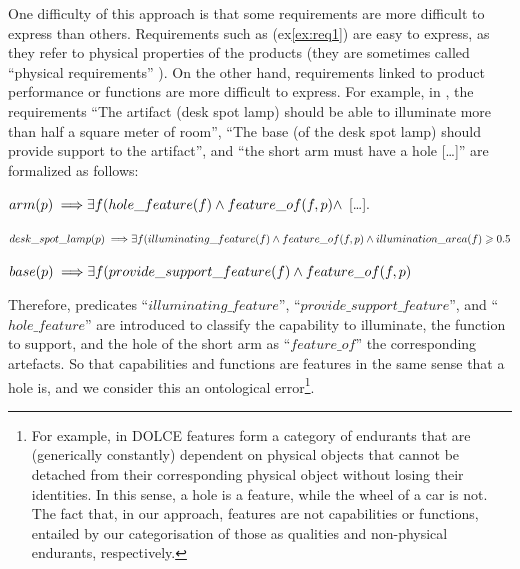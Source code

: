 \documentclass[sw]{iosart2x}
\newcommand{\bflist}{\begin{list}{}{\setlength{\topsep}{2mm}\setlength{\partopsep}{0mm}\setlength{\parsep}{0mm}\setlength{\leftmargin}{9mm}\setlength{\labelwidth}{8mm}}}
\newcommand{\eflist}{\end{list}}
\newcommand{\ExLabel}{\textrm{ex}}
\newcommand{\myex}[1]{\refstepcounter{cntex}\begin{small}{\bf \ExLabel\thecntex\label{ex:#1}}\end{small}}
\newcounter{cntex}
\newcommand{\refex}[1]{({\ExLabel}\ref{#1})}
\newcommand{\myfi}{\hspace{0.9mm} \Longrightarrow}
\newcommand{\DOLCE}{\textsc{DOLCE}\xspace} %
\newcommand{\qquotes}[1]{``#1''}
\begin{document}
One difficulty of this approach is that some requirements are more difficult to express than others.
Requirements such as \refex{ex:req1} are easy to express, as they refer to physical properties of the products (they are sometimes called \qquotes{physical requirements} \cite{jinxinlinRequirementOntologyEngineering1996}).
On the other hand, requirements linked to product performance or functions are more difficult to express.
For example, in \cite{jinxinlinRequirementOntologyEngineering1996}, the requirements \qquotes{The artifact (desk spot lamp) should be able to illuminate more than half a square meter of room}, \qquotes{The base (of the desk spot lamp) should provide support to the artifact}, and \qquotes{the short arm must have a hole [\dots]} are formalized as follows: 
\bflist
  \item[\myex{req2}] $ arm(p) \myfi \exists f(hole\_feature(f) \land
 feature\_of(f, p) \land
  $ [\dots]. 
  \item[\myex{req3}] $ desk\_spot\_lamp(p) \myfi \exists f( illuminating\_feature(f) \land feature\_of(f, p) \land illumination\_area(f) \geq 0.5 $
  \item[\myex{req4}] $ base(p) \myfi \exists f (provide\_support\_feature(f) \land feature\_of(f, p) $ 
\eflist
Therefore, predicates \qquotes{$illuminating\_feature$}, \qquotes{$provide\_support\_feature$}, and \qquotes{$hole\_feature$} are introduced to classify the capability to illuminate, the function to support, and the hole of the short arm as \qquotes{$feature\_of$} the corresponding artefacts. 
So that capabilities and functions are features in the same sense that a hole is, and we consider this an ontological error\footnote{For example, in \DOLCE features form a category of endurants that are (generically constantly) dependent on physical objects that cannot be detached from their corresponding physical object without losing their identities. In this sense, a hole is a feature, while the wheel of a car is not. The fact that, in our approach, features are not capabilities or functions, entailed by our categorisation of those as qualities and non-physical endurants, respectively.}.
\end{document}
